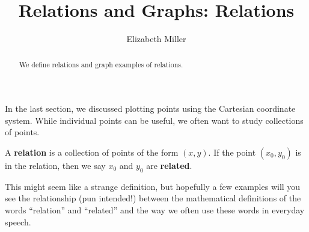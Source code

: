 \documentclass[nooutcomes]{ximera}
\author{Elizabeth Miller}
\title{Relations and Graphs: Relations}
\newcommand{\dfn}{\textbf}
\begin{document}
\begin{abstract}
We define relations and graph examples of relations. 
\end{abstract}
\maketitle


In the last section, we discussed plotting points using the Cartesian coordinate system. While individual points can be useful, we often want to study collections of points.

\begin{definition}
A \dfn{relation} is a collection of points of the form $(x,y)$.  If the point $(x_0,y_0)$ is in the relation, then we say $x_0$ and $y_0$ are \dfn{related}.
\end{definition}

This might seem like a strange definition, but hopefully a few
examples will you see the relationship (pun intended!) between the
mathematical definitions of the words ``relation'' and ``related'' and the
way we often use these words in everyday speech.

\end{document}
